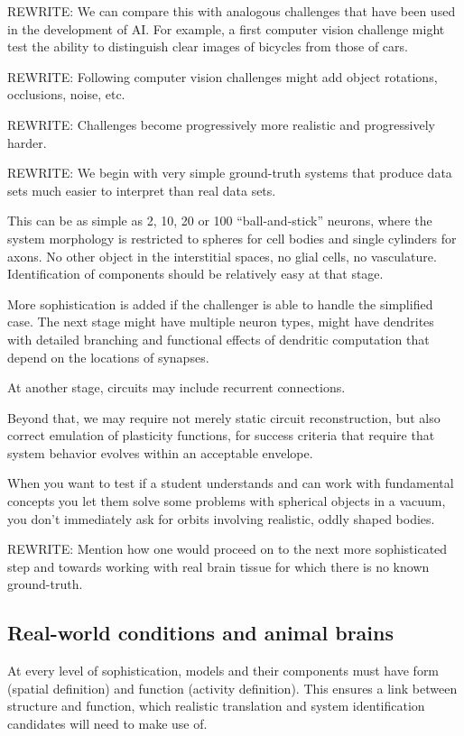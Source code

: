 \documentclass{ldr-article}
\begin{document}
\alert{REWRITE:} We can compare this with analogous challenges that have been used in the development of AI. For example, a first computer vision challenge might test the ability to distinguish clear images of bicycles from those of cars.

\alert{REWRITE:} Following computer vision challenges might add object rotations, occlusions, noise, etc.

\alert{REWRITE:} Challenges become progressively more realistic and progressively harder.

\alert{REWRITE:} We begin with very simple ground-truth systems that produce data sets much easier to interpret than real data sets.

This can be as simple as 2, 10, 20 or 100 “ball-and-stick” neurons, where the system morphology is restricted to spheres for cell bodies and single cylinders for axons. No other object in the interstitial spaces, no glial cells, no vasculature. Identification of components should be relatively easy at that stage.

More sophistication is added if the challenger is able to handle the simplified case. The next stage might have multiple neuron types, might have dendrites with detailed branching and functional effects of dendritic computation that depend on the locations of synapses.

At another stage, circuits may include recurrent connections.

Beyond that, we may require not merely static circuit reconstruction, but also correct emulation of plasticity functions, for success criteria that require that system behavior evolves within an acceptable envelope.

When you want to test if a student understands and can work with fundamental concepts you let them solve some problems with spherical objects in a vacuum, you don’t immediately ask for orbits involving realistic, oddly shaped bodies.

\alert{REWRITE:} Mention how one would proceed on to the next more sophisticated step and towards working with real brain tissue for which there is no known ground-truth.

\subsection{Real-world conditions and animal brains}

At every level of sophistication, models and their components must have form (spatial definition) and function (activity definition). This ensures a link between structure and function, which realistic translation and system identification candidates will need to make use of.
\end{document}
